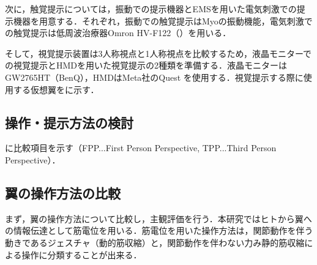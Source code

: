 \begin{small}
    次に，触覚提示については，振動での提示機器とEMSを用いた電気刺激での提示機器を用意する．それぞれ，振動での触覚提示はMyoの振動機能，電気刺激での触覚提示は低周波治療器Omron HV-F122（）\cite{Omron-HV-F122}を用いる．


    そして，視覚提示装置は3人称視点と1人称視点を比較するため，液晶モニターでの視覚提示とHMDを用いた視覚提示の2種類を準備する．液晶モニターはGW2765HT（BenQ），HMDはMeta社のQuest
    を使用する．視覚提示する際に使用する仮想翼をに示す．

  \subsection{操作・提示方法の検討}

    \begin{table}[tb]
        \begin{center}
            \caption{Comparison items}
        \end{center}
    \end{table}

    に比較項目を示す（FPP...First Person Perspective, TPP...Third Person Perspective）．


   \subsection{翼の操作方法の比較} %
      まず，翼の操作方法について比較し，主観評価を行う．本研究ではヒトから翼への情報伝達として筋電位を用いる．筋電位を用いた操作方法は，関節動作を伴う動きであるジェスチャ（動的筋収縮）と，関節動作を伴わない力み静的筋収縮\cite{thistle1967isokinetic}による操作に分類することが出来る．


\end{small}
